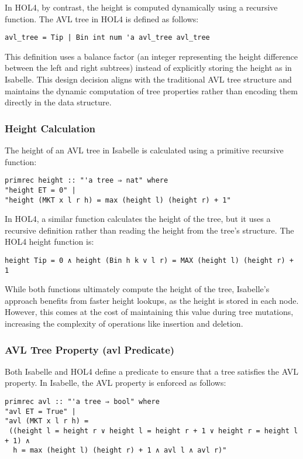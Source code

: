 \documentclass[12pt]{article}
\begin{document}
\begin{itemize}
In HOL4, by contrast, the height is computed dynamically using a recursive function. The AVL tree in HOL4 is defined as follows:

\begin{verbatim}
avl_tree = Tip | Bin int num 'a avl_tree avl_tree
\end{verbatim}

This definition uses a balance factor (an integer representing the height difference between the left and right subtrees) instead of explicitly storing the height as in Isabelle. This design decision aligns with the traditional AVL tree structure and maintains the dynamic computation of tree properties rather than encoding them directly in the data structure.

\subsubsection{Height Calculation}
The height of an AVL tree in Isabelle is calculated using a primitive recursive function:

\begin{verbatim}
primrec height :: "'a tree ⇒ nat" where
"height ET = 0" |
"height (MKT x l r h) = max (height l) (height r) + 1"
\end{verbatim}

In HOL4, a similar function calculates the height of the tree, but it uses a recursive definition rather than reading the height from the tree’s structure. The HOL4 height function is:

\begin{verbatim}
height Tip = 0 ∧ height (Bin h k v l r) = MAX (height l) (height r) + 1
\end{verbatim}

While both functions ultimately compute the height of the tree, Isabelle’s approach benefits from faster height lookups, as the height is stored in each node. However, this comes at the cost of maintaining this value during tree mutations, increasing the complexity of operations like insertion and deletion.

\subsubsection{AVL Tree Property (avl Predicate)}
Both Isabelle and HOL4 define a predicate to ensure that a tree satisfies the AVL property. In Isabelle, the AVL property is enforced as follows:

\begin{verbatim}
primrec avl :: "'a tree ⇒ bool" where
"avl ET = True" |
"avl (MKT x l r h) =
 ((height l = height r ∨ height l = height r + 1 ∨ height r = height l + 1) ∧ 
  h = max (height l) (height r) + 1 ∧ avl l ∧ avl r)"
\end{verbatim}


\end{itemize}
\end{document}
